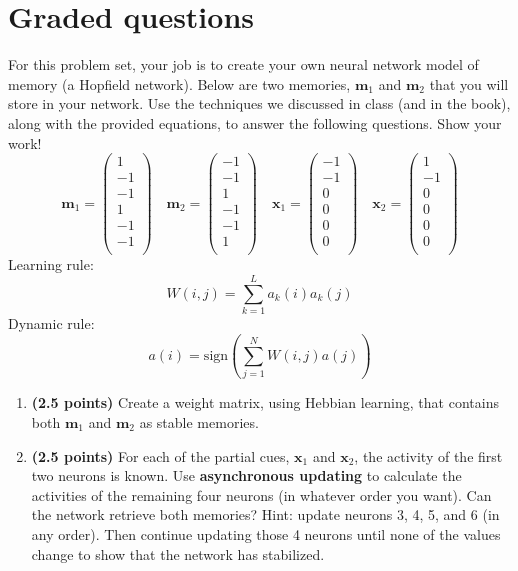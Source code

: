 \documentclass[11pt]{article}
\begin{document}
\section*{Graded questions}

For this problem set, your job is to create your own neural
  network model of memory (a Hopfield network).  Below are two
  memories, $\mathbf{m}_1$ and $\mathbf{m}_2$ that you will store in
  your network.  Use the techniques we discussed in class (and in
  the book), along with the provided equations, to answer the
  following questions.  Show your work!
\[
  \mathbf{m}_1=
  \begin{pmatrix}
    1\\
    -1\\
    -1\\
    1\\
    -1\\
    -1\\
  \end{pmatrix}\quad
  \mathbf{m}_2=
  \begin{pmatrix}
    -1\\
    -1\\
    1\\
    -1\\
    -1\\
    1\\
  \end{pmatrix}\quad
\mathbf{x}_1=
  \begin{pmatrix}
    -1\\
    -1\\
    0\\
    0\\
    0\\
    0\\
  \end{pmatrix}\quad
\mathbf{x}_2=
  \begin{pmatrix}
    1\\
    -1\\
    0\\
    0\\
    0\\
    0\\
  \end{pmatrix}
\]
Learning rule:
\[
W(i,j) = \sum_{k = 1}^L a_k(i)a_k(j)
\]
Dynamic rule:
\[
a(i) = \mathrm{sign}\left(\sum_{j=1}^N W(i,j)a(j)\right)
\]

\begin{enumerate}
\item \textbf{(2.5 points)} Create a weight matrix, using Hebbian learning, that contains
  both $\mathbf{m}_1$ and $\mathbf{m}_2$ as stable memories.

\item \textbf{(2.5 points)} For each of the partial cues, $\mathbf{x}_1$ and $\mathbf{x}_2$,
  the activity of the first two neurons is known.  Use
  \textbf{asynchronous updating} to calculate the activities of the
  remaining four neurons (in whatever order you want).  Can the
  network retrieve both memories?  Hint: update neurons 3, 4, 5, and 6
  (in any order).  Then continue updating those 4 neurons until none of the
  values change to show that the network has stabilized.
\end{enumerate}
\end{document}
